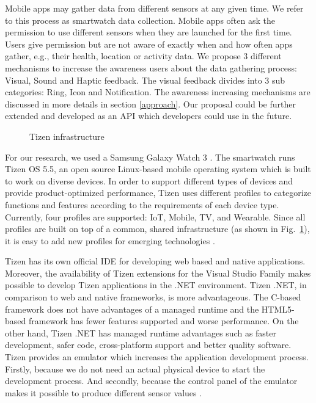 \documentclass[conference, a4paper, 10pt, twocolumn]{IEEEtran}
\begin{document}
Mobile apps may gather data from different sensors at any given time. We refer to this process as smartwatch data collection. Mobile apps often ask the permission to use different sensors when they are launched for the first time. Users give permission but are not aware of exactly when and how often apps gather, e.g., their health, location or activity data. We propose 3 different mechanisms to increase the awareness users about the data gathering process: Visual, Sound and Haptic feedback. The visual feedback divides into 3 sub categories: Ring, Icon and Notification. The awareness increasing mechanisms are discussed in more details in section \ref{approach}. Our proposal could be further extended and developed as an API which developers could use in the future.

\begin{figure}[t]
\caption{Tizen infrastructure~\cite{tizen}}
\label{fig:tizen}
\end{figure}

For our research, we used a Samsung Galaxy Watch 3 \cite{galaxyWatch3}. The smartwatch runs Tizen OS 5.5, an open source Linux-based mobile operating system which is built to work on diverse devices. In order to support different types of devices and provide product-optimized performance, Tizen uses different profiles to categorize functions and features according to the requirements of each device type. Currently, four profiles are supported: IoT, Mobile, TV, and Wearable. Since all profiles are built on top of a common, shared infrastructure (as shown in Fig.~\ref{fig:tizen}), it is easy to add new profiles for emerging technologies \cite{tizen}.

Tizen has its own official IDE for developing web based and native applications. Moreover, the availability of Tizen extensions for the Visual Studio Family makes possible to develop Tizen applications in the .NET environment. Tizen .NET, in comparison to web and native frameworks, is more advantageous. The C-based framework does not have advantages of a managed runtime and the HTML5-based framework has fewer features supported and worse performance. On the other hand, Tizen .NET has managed runtime advantages such as faster development, safer code, cross-platform support and better quality software. Tizen provides an emulator which increases the application development process. Firstly, because we do not need an actual physical device to start the development process. And secondly, because the control panel of the emulator makes it possible to produce different sensor values \cite{tizen}.
\end{document}
